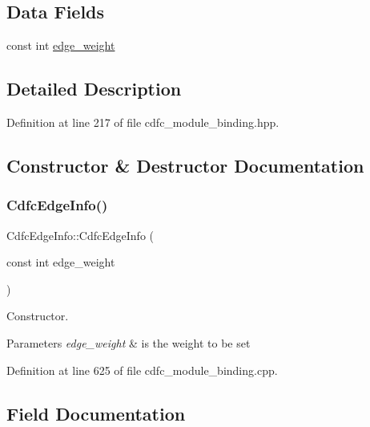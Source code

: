 \subsection*{Data Fields}
\begin{DoxyCompactItemize}
\item 
const int \hyperlink{structCdfcEdgeInfo_aef41c6921d9241b4acb077996767f52d}{edge\+\_\+weight}
\end{DoxyCompactItemize}


\subsection{Detailed Description}


Definition at line 217 of file cdfc\+\_\+module\+\_\+binding.\+hpp.



\subsection{Constructor \& Destructor Documentation}
\mbox{\label{structCdfcEdgeInfo_a30d8de9a57218fed42c5890585be6f30}} 
\subsubsection{\texorpdfstring{Cdfc\+Edge\+Info()}{CdfcEdgeInfo()}}
{\footnotesize\ttfamily Cdfc\+Edge\+Info\+::\+Cdfc\+Edge\+Info (\begin{DoxyParamCaption}\item[{const int}]{edge\+\_\+weight }\end{DoxyParamCaption})\hspace{0.3cm}{\ttfamily [explicit]}}



Constructor. 


\begin{DoxyParams}{Parameters}
{\em edge\+\_\+weight} & is the weight to be set \\
\hline
\end{DoxyParams}


Definition at line 625 of file cdfc\+\_\+module\+\_\+binding.\+cpp.



\subsection{Field Documentation}
\mbox{\label{structCdfcEdgeInfo_aef41c6921d9241b4acb077996767f52d}} 
